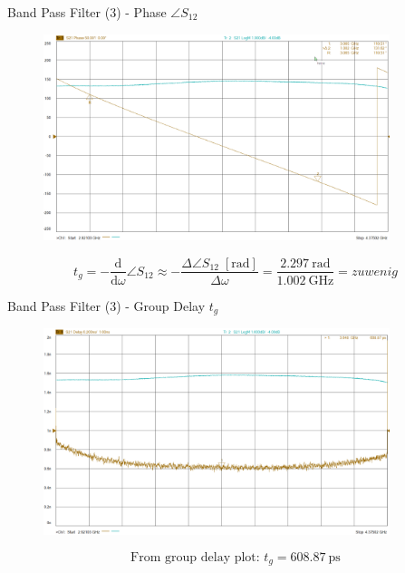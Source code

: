 \documentclass{beamer}
\begin{document}
\begin{frame}[t,fragile]{Band Pass Filter (3) - Phase $\angle S_{12}$}
\begin{figure}
  \centering
  \includegraphics[width=0.9\textwidth]{img/bandpass_phase.png}
\end{figure}
\begin{equation*}
t_g = - \frac{\text{d}}{\text{d}\omega} \angle S_{12} \approx -\frac{\Delta \angle S_{12} \;[\si{\radian}]}{\Delta \omega} = \frac{\SI{2.297}{\radian}}{\SI{1.002}{\GHz}} = zu wenig
\end{equation*}
\end{frame}

\begin{frame}[t,fragile]{Band Pass Filter (3) - Group Delay $t_g$}
\begin{figure}
  \centering
  \includegraphics[width=0.9\textwidth]{img/bandpass_groupdelay.png}
\end{figure}
\begin{equation*}
\text{From group delay plot: }t_g = \SI{608.87}{\pico\second}
\end{equation*}
\end{frame}
\end{document}
